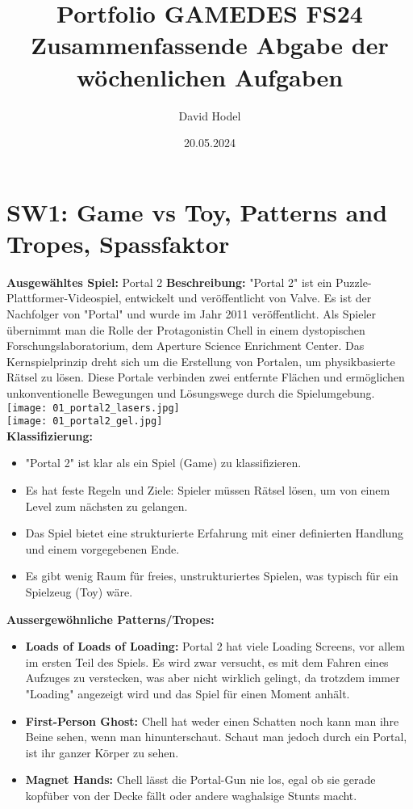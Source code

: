 \documentclass{article}
\title{%
Portfolio GAMEDES FS24\\
\large Zusammenfassende Abgabe der \\
  wöchenlichen Aufgaben}
\author{David Hodel}
\date{20.05.2024}
\begin{document}
\maketitle
\newpage

\tableofcontents
\newpage

\section{SW1: Game vs Toy, Patterns and Tropes, Spassfaktor}

\textbf{Ausgewähltes Spiel:} Portal 2
\textbf{Beschreibung:} "Portal 2" ist ein Puzzle-Plattformer-Videospiel, entwickelt und veröffentlicht von Valve.
Es ist der Nachfolger von "Portal" und wurde im Jahr 2011 veröffentlicht. Als Spieler übernimmt man die Rolle der Protagonistin
Chell in einem dystopischen Forschungslaboratorium, dem Aperture Science Enrichment Center. Das Kernspielprinzip dreht sich um die
Erstellung von Portalen, um physikbasierte Rätsel zu lösen. Diese Portale verbinden zwei entfernte Flächen und ermöglichen
unkonventionelle Bewegungen und Lösungswege durch die Spielumgebung.
\\
\texttt{[image: 01\_portal2\_lasers.jpg]}
\\
\texttt{[image: 01\_portal2\_gel.jpg]}
\\
\textbf{Klassifizierung:}
\begin{itemize}
    \item "Portal 2" ist klar als ein Spiel (Game) zu klassifizieren.
    \item Es hat feste Regeln und Ziele: Spieler müssen Rätsel lösen, um von einem Level zum nächsten zu gelangen.
    \item Das Spiel bietet eine strukturierte Erfahrung mit einer definierten Handlung und einem vorgegebenen Ende.
    \item Es gibt wenig Raum für freies, unstrukturiertes Spielen, was typisch für ein Spielzeug (Toy) wäre.
\end{itemize}
\bigskip
\textbf{Aussergewöhnliche Patterns/Tropes:}
\begin{itemize}
    \item \textbf{Loads of Loads of Loading:} Portal 2 hat viele Loading Screens, vor allem im ersten Teil des Spiels.
    Es wird zwar versucht, es mit dem Fahren eines Aufzuges zu verstecken, was aber nicht wirklich gelingt, da trotzdem immer
    "Loading" angezeigt wird und das Spiel für einen Moment anhält.
    \item \textbf{First-Person Ghost:} Chell hat weder einen Schatten noch kann man ihre Beine sehen, wenn man hinunterschaut.
    Schaut man jedoch durch ein Portal, ist ihr ganzer Körper zu sehen.
    \item \textbf{Magnet Hands:} Chell lässt die Portal-Gun nie los, egal ob sie gerade kopfüber von der Decke fällt oder andere
    waghalsige Stunts macht.
\end{itemize}
\end{document}
